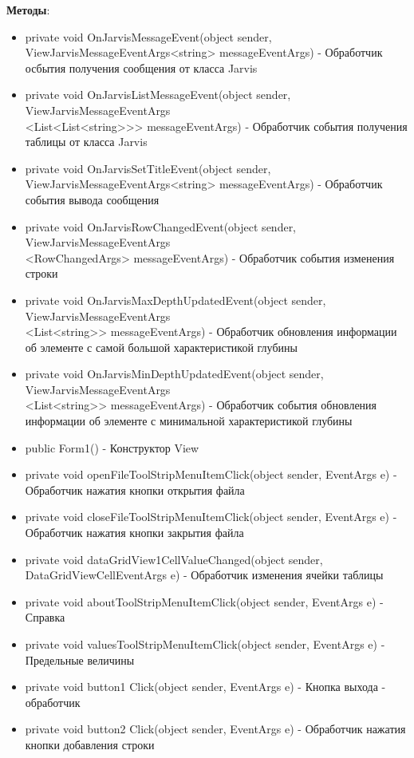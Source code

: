 \documentclass[a4paper,12pt, fleqn]{article}
\theoremstyle{plain} %
\theoremstyle{definition} %
\theoremstyle{remark} %
\numberwithin{equation}{section}
\begin{document}
\textbf{Методы}:
\begin{itemize}
\item private void OnJarvisMessageEvent(object sender, ViewJarvisMessageEventArgs<string> messageEventArgs) - Обработчик осбытия получения сообщения от класса Jarvis
\item private void OnJarvisListMessageEvent(object sender, ViewJarvisMessageEventArgs\\<List<List<string>>> messageEventArgs) - Обработчик события получения таблицы от класса Jarvis
\item private void OnJarvisSetTitleEvent(object sender, ViewJarvisMessageEventArgs<string> messageEventArgs) - Обработчик события вывода сообщения
\item private void OnJarvisRowChangedEvent(object sender, ViewJarvisMessageEventArgs\\<RowChangedArgs> messageEventArgs) - Обработчик события изменения строки
\item private void OnJarvisMaxDepthUpdatedEvent(object sender, ViewJarvisMessageEventArgs\\<List<string>> messageEventArgs) - Обработчик обновления информации об элементе с самой большой характеристикой глубины
\item private void OnJarvisMinDepthUpdatedEvent(object sender, ViewJarvisMessageEventArgs\\<List<string>> messageEventArgs) - Обработчик события обновления информации об элементе с минимальной характеристикой глубины
\item public Form1() - Конструктор View
\item private void openFileToolStripMenuItemClick(object sender, EventArgs e) - Обработчик нажатия кнопки открытия файла
\item private void closeFileToolStripMenuItemClick(object sender, EventArgs e) - Обработчик нажатия кнопки закрытия файла
\item private void dataGridView1CellValueChanged(object sender, DataGridViewCellEventArgs e) - Обработчик изменения ячейки таблицы
\item private void aboutToolStripMenuItemClick(object sender, EventArgs e) - Справка
\item  private void valuesToolStripMenuItemClick(object sender, EventArgs e) - Предельные величины
\item private void button1 Click(object sender, EventArgs e) - Кнопка выхода - обработчик
\item private void button2 Click(object sender, EventArgs e) - Обработчик нажатия кнопки добавления строки

\end{itemize}
\end{document}
